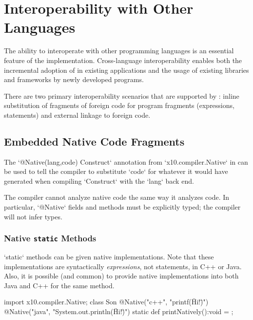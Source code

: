 \chapter{Interoperability with Other Languages}
\label{NativeCode}
\label{Interoperability}

The ability to interoperate with other programming languages is an
essential feature of the \Xten{} implementation.  Cross-language
interoperability enables both the incremental adoption of \Xten{} in
existing applications and the usage of existing libraries and
frameworks by newly developed \Xten{} programs. 

There are two primary interoperability scenarios that are supported by
\XtenCurrVer{}: inline substitution of fragments of foreign code for
\Xten program fragments (expressions, statements) and external linkage
to foreign code.

\section{Embedded Native Code Fragments}

The
\xcd`@Native(lang,code) Construct` annotation from \xcd`x10.compiler.Native` in
\Xten{} can be used to tell the \Xten{} compiler to substitute \xcd`code` for
whatever it would have generated when compiling \xcd`Construct`
with the \xcd`lang` back end.

The compiler cannot analyze native code the same way it analyzes \Xten{} code.  In
particular, \xcd`@Native` fields and methods must be explicitly typed; the
compiler will not infer types.

\subsection{Native {\tt static} Methods}

\xcd`static` methods can be given native implementations.  Note that these
implementations are syntactically {\em expressions}, not statements, in C++ or
Java.   Also, it is possible (and common) to provide native implementations
into both Java and C++ for the same method.
\begin{xten}
import x10.compiler.Native;
class Son {
  @Native("c++", "printf(\"Hi!\")")
  @Native("java", "System.out.println(\"Hi!\")")
  static def printNatively():void = {};
}
\end{xten}
%

